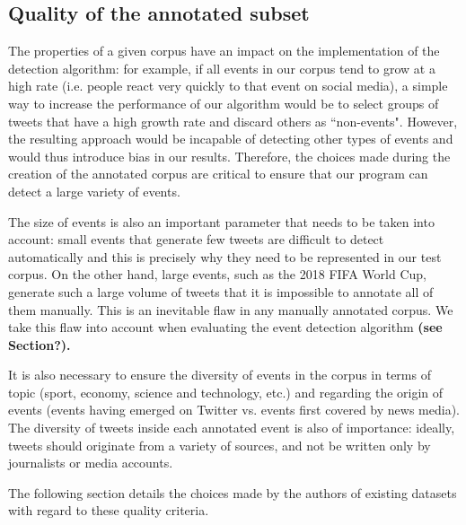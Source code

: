 \subsection{Quality of the annotated subset}

The properties of a given corpus have an impact on the implementation of the detection algorithm: for example, if all events in our corpus tend to grow at a high rate (i.e. people react very quickly to that event on social media), a simple way to increase the performance of our algorithm would be to select groups of tweets that have a high growth rate and discard others as ``non-events". However, the resulting approach would be incapable of detecting other types of events and would thus introduce bias in our results. Therefore, the choices made during the creation of the annotated corpus are critical to ensure that our program can detect a large variety of events.

The size of events is also an important parameter that needs to be taken into account: small events that generate few tweets are difficult to detect automatically and this is precisely why they need to be represented in our test corpus. On the other hand, large events, such as the 2018 FIFA World Cup, generate such a large volume of tweets that it is impossible to annotate all of them manually. This is an inevitable flaw in any manually annotated corpus. We take this flaw into account when evaluating the event detection algorithm  \textbf{\color{orange}(see Section?).}

It is also necessary to ensure the diversity of events in the corpus in terms of topic (sport, economy, science and technology, etc.) and regarding the origin of events (events having emerged on Twitter vs. events first covered by news media). The diversity of tweets inside each annotated event is also of importance: ideally, tweets should originate from a variety of sources, and not be written only by journalists or media accounts.

The following section details the choices made by the authors of existing datasets with regard to these quality criteria.
        
		


